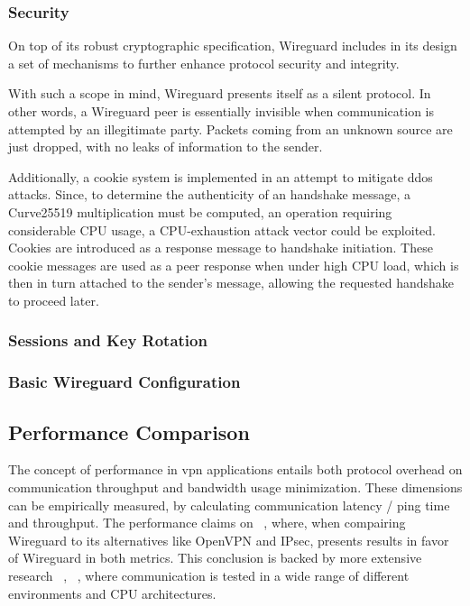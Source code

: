 \documentclass[11pt,twoside,a4paper]{report}
\begin{document}
\subsubsection{Security}

On top of its robust cryptographic specification, Wireguard includes in its design a set of mechanisms to further enhance protocol security and integrity.

With such a scope in mind, Wireguard presents itself as a silent protocol. In other words, a Wireguard peer is essentially invisible when communication is attempted by an illegitimate party. Packets coming from an unknown source are just dropped, with no leaks of information to the sender.

Additionally, a cookie system is implemented in an attempt to mitigate \acrshort{ddos} attacks. Since, to determine the authenticity of an handshake message, a Curve25519 multiplication must be computed,  an operation requiring considerable CPU usage, a CPU-exhaustion attack vector could be exploited. Cookies are introduced as a response message to handshake initiation. These cookie messages are used as a peer response when under high CPU load, which is then in turn attached to the sender's message, allowing the requested handshake to proceed later.

\subsubsection{Sessions and Key Rotation}


\subsubsection{Basic Wireguard Configuration}

\subsection{Performance Comparison}

The concept of performance in \acrshort{vpn} applications entails both protocol overhead on communication throughput and bandwidth usage minimization. These dimensions can be empirically measured, by calculating communication latency / ping time and throughput. The performance claims on ~\cite{donenfeld2017wireguard}, where, when compairing Wireguard to its alternatives like OpenVPN and IPsec, presents results in favor of Wireguard in both metrics. This conclusion is backed by more extensive research ~\cite{mackey2020performance}, ~\cite{osswald2020performance}, where communication is tested in a wide range of different environments and CPU architectures.
\end{document}

